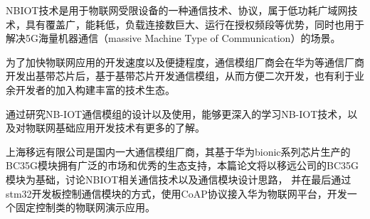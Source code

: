 	
\begin{chineseabstract}

NBIOT技术是用于物联网受限设备的一种通信技术、协议，属于低功耗广域网技术，具有覆盖广，能耗低，负载连接数巨大、运行在授权频段等优势，同时也用于解决5G海量机器通信（massive Machine Type of Communication）的场景。

为了加快物联网应用的开发速度以及便捷程度，通信模组厂商会在华为等通信厂商开发出基带芯片后，基于基带芯片开发通信模组，从而方便二次开发，也有利于业余开发者的加入构建丰富的技术生态。

通过研究NB-IOT通信模组的设计以及使用，能够更深入的学习NB-IOT技术，以及对物联网基础应用开发技术有更多的了解。

上海移远有限公司是国内一大通信模组厂商，其基于华为bionic系列芯片生产的BC35G模块拥有广泛的市场和优秀的生态支持，本篇论文将以移远公司的BC35G模块为基础，讨论NBIOT相关通信技术以及通信模块设计思路，
并在最后通过stm32开发板控制通信模块的方式，使用CoAP协议接入华为物联网平台，开发一个固定控制类的物联网演示应用。

\end{chineseabstract}


